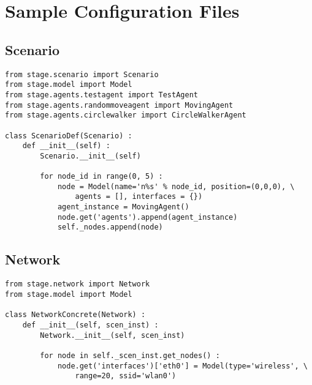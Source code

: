 \documentclass{article}
\begin{document}
\section{Sample Configuration Files}

\subsection{Scenario}

\begin{verbatim}
from stage.scenario import Scenario
from stage.model import Model
from stage.agents.testagent import TestAgent
from stage.agents.randommoveagent import MovingAgent
from stage.agents.circlewalker import CircleWalkerAgent

class ScenarioDef(Scenario) :
    def __init__(self) :
        Scenario.__init__(self)

        for node_id in range(0, 5) :
            node = Model(name='n%s' % node_id, position=(0,0,0), \
                agents = [], interfaces = {})
            agent_instance = MovingAgent()
            node.get('agents').append(agent_instance)
            self._nodes.append(node)
\end{verbatim}

\subsection{Network}

\begin{verbatim}
from stage.network import Network
from stage.model import Model

class NetworkConcrete(Network) :
    def __init__(self, scen_inst) :
        Network.__init__(self, scen_inst)

        for node in self._scen_inst.get_nodes() :
            node.get('interfaces')['eth0'] = Model(type='wireless', \
                range=20, ssid='wlan0')
\end{verbatim}
\end{document}
